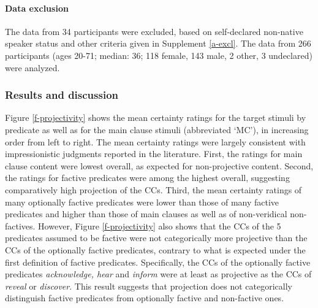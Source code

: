\documentclass[11pt,fleqn]{article}
\newcommand{\6}{\mbox{$[\hspace*{-.6mm}[$}}
\newcommand{\9}{\mbox{$]\hspace*{-.6mm}]$}}
\begin{document}

\paragraph{Data exclusion} The data from 34 participants were excluded, based on self-declared non-native speaker status and other criteria given in Supplement \ref{a-excl}. The data from 266 participants (ages 20-71; median: 36; 118 female, 143 male, 2 other, 3 undeclared) were analyzed.

\subsubsection{Results and discussion}\label{s22}

Figure \ref{f-projectivity} shows the mean certainty ratings for the target stimuli by predicate as well as for the main clause stimuli (abbreviated `MC'), in increasing order from left to right. The mean certainty ratings were largely consistent with impressionistic judgments reported in the literature. First, the ratings for main clause content were lowest overall, as expected for non-projective content. Second, the ratings for factive predicates were among the highest overall, suggesting comparatively high projection of the CCs. Third, the mean certainty ratings of many optionally factive predicates were lower than those of many factive predicates and higher than those of main clauses as well as of non-veridical non-factives. However, Figure \ref{f-projectivity} also shows that the CCs of the 5 predicates assumed to be factive were not categorically more projective than the CCs of the optionally factive predicates, contrary to what is expected under the first definition of factive predicates. Specifically, the CCs of the optionally factive predicates {\em acknowledge, hear} and {\em inform} were at least as projective as the CCs of {\em reveal} or {\em discover}. This result suggests that projection does not categorically distinguish factive predicates from optionally factive and non-factive ones.
\end{document}
